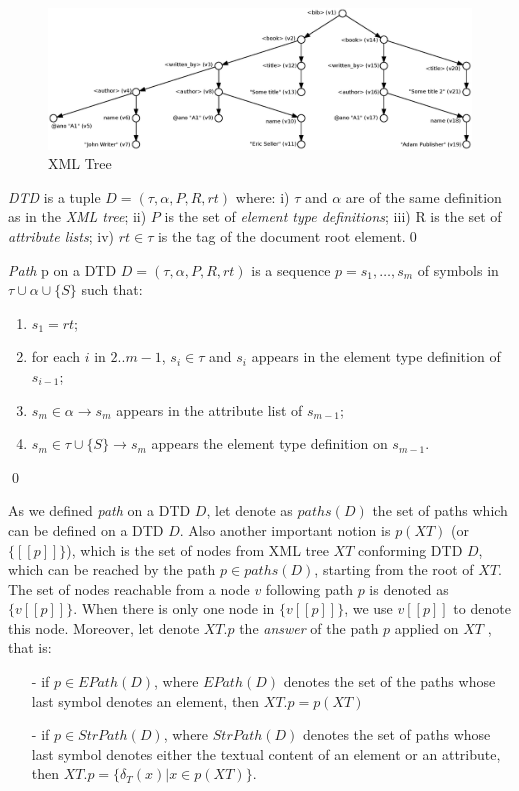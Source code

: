 \begin{figure}
    \centering\includegraphics[scale=\myscale]{example1-new}
	\caption{XML Tree} \label{example1}
\end{figure}

\begin{define}[DTD]\label{dtdDef}
{\sl DTD} is a tuple $D = (\tau, \alpha, P, R, rt)$ where: i) $\tau$ and $\alpha$ are of the same definition as in the \emph{XML tree}; ii) $P$ is the set of \emph{element type definitions}; iii) R is the set of \emph{attribute lists}; iv) $rt \in \tau$ is the tag of the document root element.\qed
\end{define}

\begin{define}[Path]
{\sl Path} p on a DTD $D = (\tau, \alpha, P, R, rt)$ is a sequence $p = s_1, \dots, s_m$ of symbols in $\tau \cup \alpha \cup \{S\}$ such that:
	\begin{enumerate}
		\item $s_1=rt$;
		\item for each $i$ in $2..m-1$, $s_i \in \tau$ and $s_i$ appears in the element type definition of $s_{i-1}$;
		\item $s_m \in \alpha \rightarrow s_m$ appears in the attribute list of $s_{m-1}$;
		\item $s_m \in \tau \cup \{S\} \rightarrow s_m$ appears the element type definition on $s_{m-1}$.
	\end{enumerate}\qed
\end{define}

As we defined \emph{path} on a DTD $D$, let denote as $paths(D)$ the set of paths which can be defined on a DTD $D$. Also another important notion is $p(XT)$ (or $\{[\![p]\!]\}$), which is the set of nodes from XML tree $XT$ conforming DTD $D$, which can be reached by the path $p \in paths(D)$, starting from the root of $XT$. The set of nodes reachable from a node $v$ following path $p$ is denoted as $\{v[\![p]\!]\}$. When there is only one node in $\{v[\![p]\!]\}$, we use $v[\![p]\!]$ to denote this node. Moreover, let denote $XT.p$ the \emph{answer} of the path $p$ applied on $XT$ , that is:
\begin{itemize}
	\item[-] if $p \in EPath(D)$, where $EPath(D)$ denotes the set of the paths whose last symbol denotes an element, then $XT.p = p(XT)$
	\item[-] if $p \in StrPath(D)$, where $StrPath(D)$ denotes the set of paths whose last symbol denotes either the textual content of an element or an
attribute, then $XT.p = \{\delta_T(x)|x \in p(XT)\}$.
\end{itemize}

